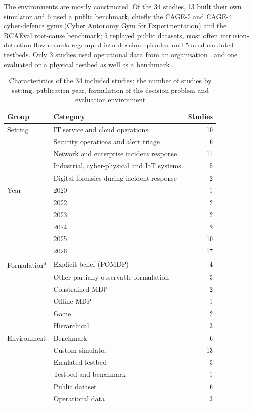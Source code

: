 \documentclass[pdflatex,sn-basic]{sn-jnl}
\begin{document}
The environments are mostly constructed. Of the 34 studies, 13 built their own simulator and 6 used a public benchmark, chiefly the CAGE-2 and CAGE-4 cyber-defence gyms (Cyber Autonomy Gym for Experimentation) and the RCAEval root-cause benchmark; 6 replayed public datasets, most often intrusion-detection flow records regrouped into decision episodes, and 5 used emulated testbeds. Only 3 studies used operational data from an organisation \citep{peralta2025,wang2023hrlhf,ding2023}, and one evaluated on a physical testbed as well as a benchmark \citep{hammar2026belief}.

\begin{table}[!htbp]
\caption{Characteristics of the 34 included studies: the number of studies by setting, publication year, formulation of the decision problem and evaluation environment}\label{tab:summary}
\footnotesize
\begin{tabularx}{\textwidth}{@{}lLr@{}}
\toprule
Group & Category & Studies \\
\midrule
Setting & IT service and cloud operations & 10 \\
 & Security operations and alert triage & 6 \\
 & Network and enterprise incident response & 11 \\
 & Industrial, cyber-physical and IoT systems & 5 \\
 & Digital forensics during incident response & 2 \\
\midrule
Year & 2020 & 1 \\
 & 2022 & 2 \\
 & 2023 & 2 \\
 & 2024 & 2 \\
 & 2025 & 10 \\
 & 2026 & 17 \\
\midrule
Formulation\textsuperscript{a} & Explicit belief (POMDP) & 4 \\
 & Other partially observable formulation & 5 \\
 & Constrained MDP & 2 \\
 & Offline MDP & 1 \\
 & Game & 2 \\
 & Hierarchical & 3 \\
\midrule
Environment & Benchmark & 6 \\
 & Custom simulator & 13 \\
 & Emulated testbed & 5 \\
 & Testbed and benchmark & 1 \\
 & Public dataset & 6 \\
 & Operational data & 3 \\
\botrule
\end{tabularx}
\end{table}
\end{document}
